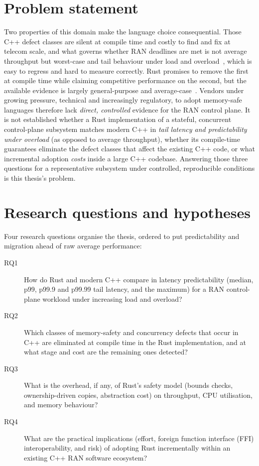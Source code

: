\section{Problem statement}
Two properties of this domain make the language choice consequential. Those C++ defect classes
are silent at compile time and costly to find and fix at telecom scale, and what governs whether
RAN deadlines are met is not average throughput but worst-case and tail behaviour under load and
overload~\cite{dean2013tail}, which is easy to regress and hard to measure correctly. Rust
promises to remove the first at compile time while claiming competitive performance on the
second, but the available evidence is largely general-purpose and
average-case~\cite{balasubramanian2017rust,qin2020rust}. Vendors under growing pressure,
technical and increasingly regulatory, to adopt memory-safe languages therefore lack
\emph{direct, controlled} evidence for the RAN control plane. It is not established whether a
Rust implementation of a stateful, concurrent control-plane subsystem matches modern C++ in
\emph{tail latency and predictability under overload} (as opposed to average throughput), whether
its compile-time guarantees eliminate the defect classes that affect the existing C++ code, or
what incremental adoption \emph{costs} inside a large C++ codebase. Answering those three
questions for a representative subsystem under controlled, reproducible conditions is this
thesis's problem.

\section{Research questions and hypotheses}\label{sec:rqs}
Four research questions organise the thesis, ordered to put predictability and migration ahead of
raw average performance:

\begin{description}
  \item[RQ1] How do Rust and modern C++ compare in latency predictability (median, p99,
        p99.9 and p99.99 tail latency, and the maximum) for a RAN control-plane workload
        under increasing load and overload?
  \item[RQ2] Which classes of memory-safety and concurrency defects that occur in C++ are
        eliminated at compile time in the Rust implementation, and at what stage and cost
        are the remaining ones detected?
  \item[RQ3] What is the overhead, if any, of Rust's safety model (bounds checks,
        ownership-driven copies, abstraction cost) on throughput, CPU utilisation, and
        memory behaviour?
  \item[RQ4] What are the practical implications (effort, foreign function interface (FFI)
        interoperability, and risk) of adopting Rust incrementally within an existing C++ RAN
        software ecosystem?
\end{description}

